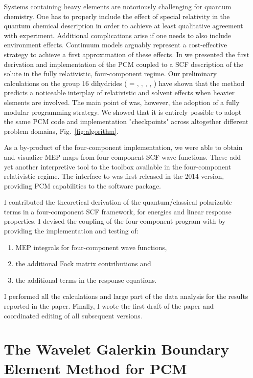 Systems containing heavy elements are notoriously challenging for quantum chemistry.
One has to properly include the effect of special relativity in the
quantum chemical description in order to achieve at least qualitative
agreement with experiment.
Additional complications arise if one needs to also include environment effects.
Continuum models arguably represent a cost-effective strategy to achieve a first
approximation of these effects.
In  we presented the first derivation and implementation of the \acrshort{PCM}
coupled to a \acrshort{SCF} description of the solute in the fully relativistic, four-component
regime.
Our preliminary calculations on the group 16 dihydrides  ( =
, , , , ) have shown that the method predicts
a noticeable interplay of relativistic and solvent effects when heavier
elements are involved.
The main point of  was, however, the adoption of a fully modular
programming strategy. We showed that it is entirely possible to adopt the same
\acrshort{PCM} code and implementation "checkpoints" across altogether different
problem domains, Fig.~\ref{fig:algorithm}.

As a by-product of the four-component implementation, we were able to obtain and visualize \acrshort{MEP} maps
from four-component \acrshort{SCF} wave functions. These add yet another interpretive tool to the toolbox available
in the four-component relativistic regime.
The interface to \DIRAC was first released in the 2014 version,
providing \acrshort{PCM} capabilities to the software package.

I contributed the theoretical derivation of the quantum/classical polarizable
terms in a four-component \acrshort{SCF} framework, for energies and linear response
properties. I devised the coupling of the four-component program \DIRAC with
\pcmsolver by providing the implementation and testing of:
\begin{enumerate}
  \item \acrshort{MEP} integrals for four-component wave functions,
  \item the additional Fock matrix contributions and
  \item the additional terms in the response equations.
\end{enumerate}
I performed all the calculations and large part of the data analysis
for the results reported in the paper.
Finally, I wrote the first draft of the paper and coordinated editing of
all subsequent versions.

\section{The Wavelet Galerkin Boundary Element Method for PCM}\label{sec:wemlin}

